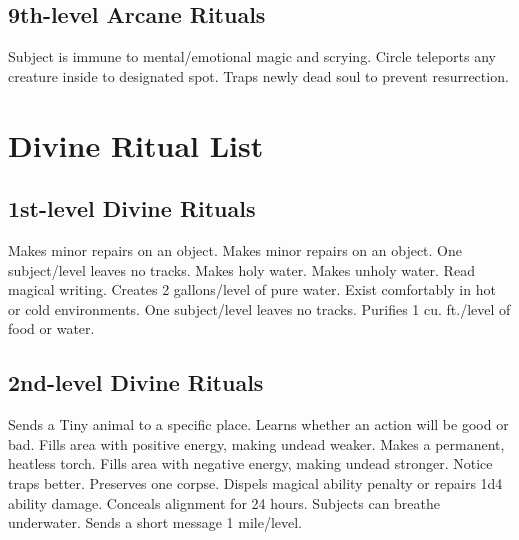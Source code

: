 \subsection{9th-level Arcane Rituals}
\begin{rituallist}
   Subject is immune to mental/emotional magic and scrying.
   Circle teleports any creature inside to designated spot.
  \F Traps newly dead soul to prevent resurrection.
\end{rituallist}

\section{Divine Ritual List}
\subsection{1st-level Divine Rituals}
\begin{rituallist}
   Makes minor repairs on an object.
   Makes minor repairs on an object.
   One subject/level leaves no tracks.
   Makes holy water.
   Makes unholy water.
   Read magical writing.
   Creates 2 gallons/level of pure water.
   Exist comfortably in hot or cold environments.
   One subject/level leaves no tracks.
   Purifies 1 cu. ft./level of food or water.
\end{rituallist}

\subsection{2nd-level Divine Rituals}
\begin{rituallist}
   Sends a Tiny animal to a specific place.
  \M\F Learns whether an action will be good or bad.
   Fills area with positive energy, making undead weaker.
   Makes a permanent, heatless torch.
   Fills area with negative energy, making undead stronger.
   Notice traps better.
   Preserves one corpse.
   Dispels magical ability penalty or repairs 1d4 ability damage.
   Conceals alignment for 24 hours.
   Subjects can breathe underwater.
   Sends a short message 1 mile/level.
\end{rituallist}

